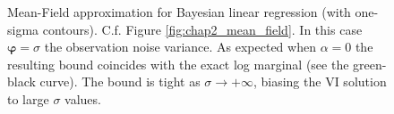 \begin{figure}[t]
 \centering
 \hspace{0.5in}
 \caption{Mean-Field approximation for Bayesian linear regression (with one-sigma contours). C.f. Figure \ref{fig:chap2_mean_field}. In this case $\bm{\varphi} = \sigma$ the observation noise variance. As expected when $\alpha = 0$ the resulting bound coincides with the exact log marginal (see the green-black curve). The bound is tight as $\sigma \rightarrow +\infty$, biasing the VI solution to large $\sigma$ values.}
\end{figure}
